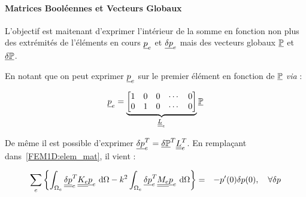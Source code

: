 \paragraph{Matrices Booléennes et Vecteurs Globaux}
\newcommand{\GP}{\ul{\mathbb{P}}}
\newcommand{\GDP}{\ul{\delta\mathbb{P}}}
L'objectif est maitenant d'exprimer l'intérieur de la somme en fonction non plus des extrémités de l'éléments en cours
$\underline{p}_e$ et $\underline{\delta p}_e$ mais des vecteurs globaux $\GP$ et $\GDP$.

En notant que on peut exprimer $\underline{p}_e$ sur le premier élément en fonction de $\GP$ \textit{via} :

\begin{equation*}
    \ul{p}_e =
    \underbrace{\begin{bmatrix}
         1 & 0 & 0 & \cdots & 0\\
         0 & 1 & 0 & \cdots & 0
    \end{bmatrix}}_{\uul{L}_e}\GP
\end{equation*}

De même il est possible d'exprimer $\ul{\DP}_e^T = \GDP^T\uul{L}_e^T$. En remplaçant dans~\eqref{FEM1D:elem_mat}, il
vient :

\begin{eqnarray}
    \sum_e \left\{\int_{\Omega_e}
        \underline{\underline{\delta p}}_e^T\underline{\underline{K_e}}\underline{p}_e~\mathrm{d}\Omega - k^2\int_{\Omega_e} \underline{\delta p}_e^T\underline{\underline{M_e}}\underline{p}_e~\mathrm{d}\Omega \right\}
        & = & -p'(0)\delta p(0), \quad \forall\delta p\notag\\
\end{eqnarray}
